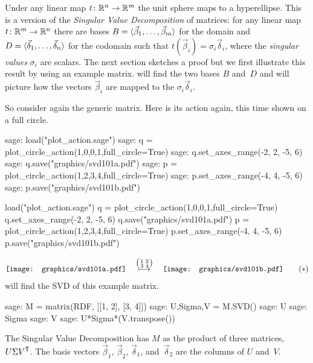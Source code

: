 Under any linear map $\mbox{$t\colon \mathbb{R}^n\to \mathbb{R}^m$}$ the 
unit sphere maps to a hyperellipse.
This is a version of the \textit{Singular Value Decomposition} of
matrices:
for any linear map $\mbox{$t\colon \mathbb{R}^m\to \mathbb{R}^n$}$ there are bases
$B=\langle\vec{\beta}_1,\ldots,\vec{\beta}_m\rangle$ for the domain and
$D=\langle\vec{\delta}_1,\ldots,\vec{\delta}_n\rangle$ for the codomain
such that $t(\vec{\beta}_i)=\sigma_i\vec{\delta}_i$, where the
\textit{singular values}
$\sigma_i$ are scalars.
The next section sketches a proof
but we first illustrate this result by using an example matrix.
\Sage{} will find the two bases $B$ and~$D$ and will picture how the 
vectors $\vec{\beta}_i$ 
are mapped to the $\sigma_i\vec{\delta}_i$.

So consider again the generic matrix.
Here is its action again, this time shown
on a full circle.
\begin{sagecommandline}
sage: load("plot_action.sage")
sage: q = plot_circle_action(1,0,0,1,full_circle=True) 
sage: q.set_axes_range(-2, 2, -5, 6) 
sage: q.save("graphics/svd101a.pdf")
sage: p = plot_circle_action(1,2,3,4,full_circle=True) 
sage: p.set_axes_range(-4, 4, -5, 6) 
sage: p.save("graphics/svd101b.pdf")
\end{sagecommandline}
\begin{sagesilent}
load("plot_action.sage")
q = plot_circle_action(1,0,0,1,full_circle=True) 
q.set_axes_range(-2, 2, -5, 6) 
q.save("graphics/svd101a.pdf")
p = plot_circle_action(1,2,3,4,full_circle=True) 
p.set_axes_range(-4, 4, -5, 6) 
p.save("graphics/svd101b.pdf")
\end{sagesilent}
\begin{equation*}
  \vcenteredhbox{\texttt{[image: graphics/svd101a.pdf]}}
  \quad\mapsunder{\big (\begin{smallmatrix} 1 &2 \\ 3 &4 \end{smallmatrix}\big )}\quad
  \vcenteredhbox{\texttt{[image: graphics/svd101b.pdf]}}
  \tag{$*$}
\end{equation*}
\Sage{} will find the SVD of this example matrix.
\begin{sagecommandline}
sage: M = matrix(RDF, [[1, 2], [3, 4]])
sage: U,Sigma,V = M.SVD()
sage: U
sage: Sigma
sage: V
sage: U*Sigma*(V.transpose())
\end{sagecommandline}
\noindent 
The Singular Value Decomposition has $M$ as the product of
three matrices, $U\Sigma{{V}^{\mathsf{T}}}$.
The basis vectors $\vec{\beta}_1$, $\vec{\beta}_2$, $\vec{\delta}_1$, 
and~$\vec{\delta}_2$ are the columns of $U$ and~$V$. 
